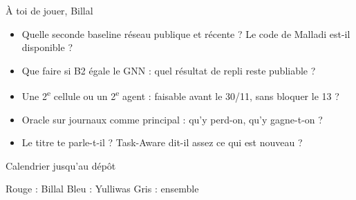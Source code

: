 \documentclass[aspectratio=169,11pt]{beamer}
\newcommand{\rb}[1]{\textcolor{rouge}{#1}}
\newcommand{\bb}[1]{\textcolor{bleu}{#1}}
\newcommand{\barre}[5]{\node[left] at (-0.5,-#1) {#2}; \fill[#5] (#3,-#1-0.3) rectangle (#4,-#1+0.3);}
\begin{document}
\begin{frame}{À toi de jouer, Billal}
\begin{itemize}
\item Quelle seconde baseline réseau publique et récente ? Le code de Malladi est-il disponible ?
\item Que faire si B2 égale le GNN : quel résultat de repli reste publiable ?
\item Une 2\textsuperscript{e} cellule ou un 2\textsuperscript{e} agent : faisable avant le 30/11, sans bloquer le 13 ?
\item Oracle sur journaux comme principal : qu'y perd-on, qu'y gagne-t-on ?
\item Le titre te parle-t-il ? \og Task-Aware\fg{} dit-il assez ce qui est nouveau ?
\end{itemize}
\end{frame}

\begin{frame}{Calendrier jusqu'au dépôt}
\centering
{}

\vspace{1mm}
{\small \rb{Rouge} : Billal \quad \bb{Bleu} : Yulliwas \quad Gris : ensemble}
\end{frame}
\end{document}
